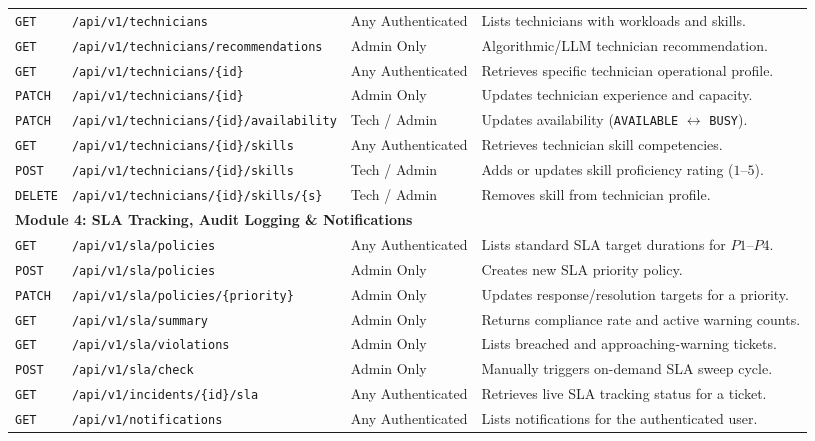 \documentclass[11pt,a4paper,oneside]{report}
\begin{document}
\begin{table}[H]
\begin{tabular}{p{1.2cm}p{5.5cm}p{2.5cm}p{5.0cm}}
\midrule
\texttt{GET} & \texttt{/api/v1/technicians} & Any Authenticated & Lists technicians with workloads and skills. \\
\texttt{GET} & \texttt{/api/v1/technicians/recommendations}& Admin Only & Algorithmic/LLM technician recommendation. \\
\texttt{GET} & \texttt{/api/v1/technicians/\{id\}} & Any Authenticated & Retrieves specific technician operational profile. \\
\texttt{PATCH} & \texttt{/api/v1/technicians/\{id\}} & Admin Only & Updates technician experience and capacity. \\
\texttt{PATCH} & \texttt{/api/v1/technicians/\{id\}/availability}& Tech / Admin & Updates availability (\texttt{AVAILABLE} $\leftrightarrow$ \texttt{BUSY}). \\
\texttt{GET} & \texttt{/api/v1/technicians/\{id\}/skills} & Any Authenticated & Retrieves technician skill competencies. \\
\texttt{POST} & \texttt{/api/v1/technicians/\{id\}/skills} & Tech / Admin & Adds or updates skill proficiency rating ($1$--$5$). \\
\texttt{DELETE} & \texttt{/api/v1/technicians/\{id\}/skills/\{s\}}& Tech / Admin & Removes skill from technician profile. \\
\midrule
\multicolumn{4}{l}{\textbf{Module 4: SLA Tracking, Audit Logging \& Notifications}} \\
\midrule
\texttt{GET} & \texttt{/api/v1/sla/policies} & Any Authenticated & Lists standard SLA target durations for $P1$--$P4$. \\
\texttt{POST} & \texttt{/api/v1/sla/policies} & Admin Only & Creates new SLA priority policy. \\
\texttt{PATCH} & \texttt{/api/v1/sla/policies/\{priority\}} & Admin Only & Updates response/resolution targets for a priority. \\
\texttt{GET} & \texttt{/api/v1/sla/summary} & Admin Only & Returns compliance rate and active warning counts. \\
\texttt{GET} & \texttt{/api/v1/sla/violations} & Admin Only & Lists breached and approaching-warning tickets. \\
\texttt{POST} & \texttt{/api/v1/sla/check} & Admin Only & Manually triggers on-demand SLA sweep cycle. \\
\texttt{GET} & \texttt{/api/v1/incidents/\{id\}/sla} & Any Authenticated & Retrieves live SLA tracking status for a ticket. \\
\texttt{GET} & \texttt{/api/v1/notifications} & Any Authenticated & Lists notifications for the authenticated user. \\

\end{tabular}
\end{table}
\end{document}

